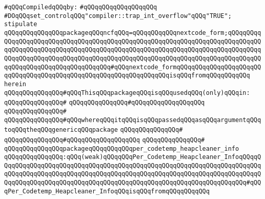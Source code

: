 \newline
\verb|#qQQqCompiledqQQqby:|\newline
\verb|#qQQqqQQqqQQqqQQqqQQq|\newline
\newline
\newline
\newline
\verb|#DOqQQqset_controlqQQq"compiler::trap_int_overflow"qQQq"TRUE";|\newline
\newline
\verb|stipulate|\newline
\verb|qQQqqQQqqQQqqQQqpackageqQQqncfqQQq=qQQqqQQqqQQqnextcode_form;qQQqqQQqqQQqqQQqqQQqqQQqqQQqqQQqqQQqqQQqqQQqqQQqqQQqqQQqqQQqqQQqqQQqqQQqqQQqqQQqqQQqqQQqqQQqqQQqqQQqqQQqqQQqqQQqqQQqqQQqqQQqqQQqqQQqqQQqqQQqqQQqqQQqqQQqqQQqqQQqqQQqqQQqqQQqqQQqqQQqqQQqqQQqqQQqqQQqqQQqqQQqqQQqqQQqqQQqqQQqqQQqqQQqqQQqqQQqqQQqqQQqqQQq#qQQqnextcode_formqQQqqQQqqQQqqQQqqQQqqQQqqQQqqQQqqQQqqQQqqQQqqQQqqQQqqQQqqQQqqQQqqQQqisqQQqfromqQQqqQQqqQQq|\newline
\verb|herein|\newline
\newline
\verb|qQQqqQQqqQQqqQQq#qQQqThisqQQqpackageqQQqisqQQqusedqQQq(only)qQQqin:|\newline
\verb|qQQqqQQqqQQqqQQq#|\newline
\verb|qQQqqQQqqQQqqQQq#qQQqqQQqqQQqqQQqqQQq|\newline
\verb|qQQqqQQqqQQqqQQq#|\newline
\verb|qQQqqQQqqQQqqQQq#qQQqwhereqQQqitqQQqisqQQqpassedqQQqasqQQqargumentqQQqtoqQQqtheqQQqgenericqQQqpackage|\newline
\verb|qQQqqQQqqQQqqQQq#|\newline
\verb|qQQqqQQqqQQqqQQq#qQQqqQQqqQQqqQQqqQQq|\newline
\verb|qQQqqQQqqQQqqQQq#|\newline
\verb|qQQqqQQqqQQqqQQqpackageqQQqqQQqqQQqper_codetemp_heapcleaner_info|\newline
\verb|qQQqqQQqqQQqqQQq:qQQq(weak)qQQqqQQqPer_Codetemp_Heapcleaner_InfoqQQqqQQqqQQqqQQqqQQqqQQqqQQqqQQqqQQqqQQqqQQqqQQqqQQqqQQqqQQqqQQqqQQqqQQqqQQqqQQqqQQqqQQqqQQqqQQqqQQqqQQqqQQqqQQqqQQqqQQqqQQqqQQqqQQqqQQqqQQqqQQqqQQqqQQqqQQqqQQqqQQqqQQqqQQqqQQqqQQqqQQqqQQqqQQqqQQqqQQqqQQqqQQqqQQq#qQQqPer_Codetemp_Heapcleaner_InfoqQQqisqQQqfromqQQqqQQqqQQq|\newline
